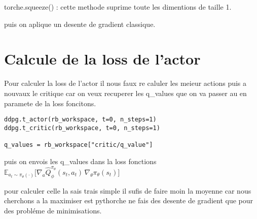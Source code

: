 \documentclass[12pt]{article}
\begin{document}
torche.squeeze() : cette methode suprime toute les dimentions de taille 1.



puis on aplique un desente de gradient classique.

\section{Calcule de la loss de l'actor}

Pour calculer la loss de l'actor il nous faux re caluler les meieur actions puis a nouvaux le critique car on veux recuperer les q\_values que on va passer au en paramete de la loss foncitons.

\begin{verbatim}
ddpg.t_actor(rb_workspace, t=0, n_steps=1)
ddpg.t_critic(rb_workspace, t=0, n_steps=1)

q_values = rb_workspace["critic/q_value"]
\end{verbatim}

puis on envois les q\_values dans la loss fonctions $\mathbb{E}_{a_t \sim \pi_\theta(\cdot)} 
\big[ \nabla_a \hat{Q}_{\phi}^{\pi_\theta}(s_t, a_t) \, \nabla_\theta \pi_\theta(s_t) \big]$

pour calculer celle la sais trais simple il sufis de faire moin la moyenne car nous cherchons a la maximiser est pythorche ne fais des desente de gradient que pour des probléme de minimisations.
\end{document}
